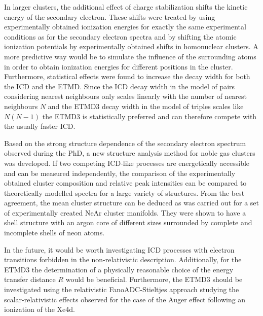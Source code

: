 In larger clusters, the additional effect of charge stabilization
shifts the kinetic energy of the secondary
electron. These shifts were treated by using experimentally obtained
ionization energies for exactly the same experimental conditions as for the
secondary electron spectra and by shifting the atomic ionization potentials
by experimentally obtained shifts in homonuclear clusters.
A more predictive way would be to simulate the influence of the surrounding
atoms in order to obtain ionization energies for different positions in
the cluster.
Furthermore, statistical effects were found to increase the decay width
for both the ICD and the ETMD. Since the ICD decay width in the model of pairs
considering nearest neighbours only scales linearly with the number
of nearest neighbours $N$ and the ETMD3 decay width in the model of triples
scales like $N(N-1)$
the ETMD3 is statistically preferred and can therefore compete
with the usually faster ICD.

Based on the strong structure dependence of the secondary electron spectrum
observed during the PhD, a new
structure analysis method for noble gas clusters was developed. If two
competing ICD-like processes are energetically accessible and can be measured
independently, the comparison of the experimentally obtained cluster
composition and relative peak intensities can be compared to theoretically
modelled spectra for a large variety of structures. From the best agreement,
the mean cluster structure can be deduced as was carried out for
a set of experimentally created NeAr cluster manifolds. They were shown
to have a shell structure with an argon core of different sizes surrounded
by complete and incomplete shells of neon atoms.

In the future, it would be worth investigating \ac{ICD} processes with electron
transitions forbidden in the non-relativistic description.
Additionally, for the ETMD3 the determination of a physically reasonable
choice of the energy transfer distance $R$ would be beneficial.
Furthermore, the ETMD3 should be investigated using the relativistic
FanoADC-Stieltjes approach studying the scalar-relativistic effects observed
for the case of the Auger effect following an ionization of the Xe4d.


